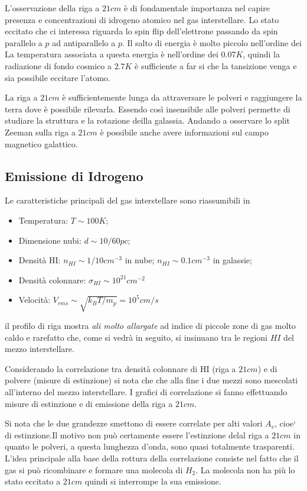 L'osservazione della riga a $21cm$ \`e di fondamentale importanza nel capire presenza e concentrazioni di idrogeno atomico nel gas interstellare. Lo stato eccitato che ci interessa riguarda lo spin flip dell'elettrone passando da spin parallelo a $p$ ad antiparallelo a $p$. Il salto di energia \`e molto piccolo nell'ordine dei
La temperatura associata a questa energia \`e nell'ordine dei $0.07K$, quindi la radiazione di fondo cosmico a $2.7K$ \`e sufficiente a far si che la tansizione venga e sia possibile eccitare l'atomo.

La riga a $21cm$ \`e sufficientemente lunga da attraversare le polveri e raggiungere la terra dove \`e possibile rilevarla. Essendo cos\`i insensibile alle polveri permette di studiare la struttura e la rotazione deilla galassia. Andando a osservare lo split Zeeman sulla riga a $21cm$ \`e possibile anche avere informazioni sul campo magnetico galattico.

\subsection{Emissione di Idrogeno}
Le caratteristiche principali del gas interstellare sono riassumibili in
\begin{itemize}
		\item Temperatura: $T\sim 100K$;
		\item Dimensione nubi: $d\sim 10/60 pc$;
		\item Densit\`a HI: $n_{HI}\sim 1/10 cm^{-3}$ in nube;
				\subitem $n_{HI}\sim 0.1 cm^{-3}$ in galassie;
		\item Densit\`a colonnare: $\sigma_{HI} \sim 10^{21} cm^{-2}$
		\item Velocit\`a: $V_{rms}\sim \sqrt{k_B T/ m_p} = 10^5 cm/s$
\end{itemize}
il profilo di riga mostra \emph{ali molto allargate} ad indice di piccole zone di gas molto caldo e rarefatto che, come si vedr\`a in seguito, si insinuano tra le regioni $HI$ del mezzo interstellare.

Considerando la correlazione tra densit\`a colonnare di HI (riga a $21cm$) e di polvere (misure di estinzione) si nota che che alla fine i due mezzi sono mescolati all'interno del mezzo interstellare.
I grafici di correlazione si fanno effettuando misure di estinzione e di emissione della riga a $21cm$.

Si nota che le due grandezze smettono di essere correlate per alti valori $A_v$, cioe` di estinzione.Il motivo non pu\`o certamente essere l'estinzione delal riga a $21cm$ in quanto le polveri, a questa lunghezza d'onda, sono quasi totalmente trasparenti. L'idea principale alla base della rottura della correlazione consiste nel fatto che il gas si pu\`o ricombinare e formare una molecola di $H_2$. La molecola non ha pi\`u lo stato eccitato a $21cm$ quindi si interrompe la sua emissione.

